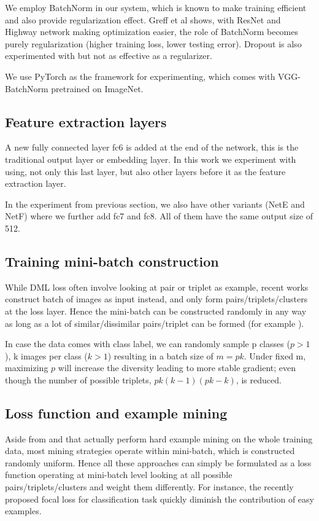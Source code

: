 \documentclass[10pt,twocolumn,letterpaper]{article}
\begin{document}
We employ BatchNorm \cite{ioffe2015batch} in our system, which is known to make training efficient and also provide regularization effect. Greff  et al \cite{greff2016highway} shows, with ResNet and Highway network making optimization easier, the role of BatchNorm becomes purely regularization (higher training loss, lower testing error). Dropout is also experimented with but not as effective as a regularizer.

We use PyTorch as the framework for experimenting, which comes with VGG-BatchNorm pretrained on ImageNet.

\subsection{Feature extraction layers}

A new fully connected layer fc6 is added at the end of the network, this is the traditional output layer or embedding layer. In this work we experiment with using, not only this last layer, but also other layers before it as the feature extraction layer.

In the experiment from previous section, we also have other variants (NetE and NetF) where we further add fc7 and fc8. All of them have the same output size of 512.

\subsection{Training mini-batch construction}



While DML loss often involve looking at pair or triplet as example, recent works construct batch of images as input instead, and only form pairs/triplets/clusters at the loss layer. Hence the mini-batch can be constructed randomly in any way as long as a lot of similar/dissimilar pairs/triplet can be formed (for example \cite{vo2016localizing, sohn2016improved}).

In case the data comes with class label, we can randomly sample p classes ($p>1$), k images per class ($k>1$) resulting in a batch size of $m=pk$. Under fixed m, maximizing $p$ will increase the diversity leading to more stable gradient; even though the number of possible triplets, $pk(k-1)(pk-k)$, is reduced.

\subsection{Loss function and example mining}
Aside from \cite{radenovic2016cnn} and \cite{kumar2017smart} that actually perform hard example mining on the whole training data, most mining strategies operate within mini-batch, which is constructed randomly uniform. Hence all these approaches can simply be formulated as a loss function operating at mini-batch level looking at all possible pairs/triplets/clusters and weight them differently. For instance, the recently proposed focal loss for classification task \cite{lin2017focal} quickly diminish the contribution of easy examples.
\end{document}
